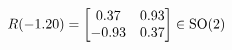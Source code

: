 \documentclass[preview]{standalone}
\begin{document}
\begin{align*}
\special{dvisvgm:raw <g id='unique000'>}R(-1.20) = \begin{bmatrix} 0.37 & 0.93 \\ -0.93 & 0.37 \end{bmatrix} \in \text{SO}(2)\special{dvisvgm:raw </g>}
\end{align*}
\end{document}
